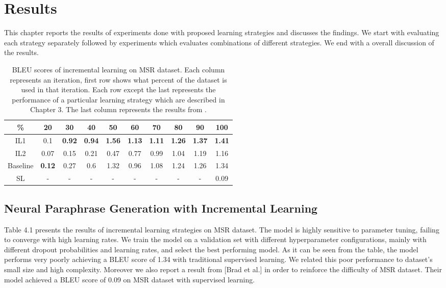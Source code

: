 \chapter{Results}\label{results}

This chapter reports the results of experiments done with proposed learning strategies and discusses the findings. We start with evaluating each strategy separately followed by experiments which evaluates combinations of different strategies. We end with a overall discussion of the results.

\begin{table}[t]
\centering
\large
 \begin{tabular}{|c | c | c | c | c | c | c | c | c | c |} 
 \hline
 \% & 20 & 30 & 40 & 50 & 60 & 70 & 80 & 90 & 100 \\ [0.5ex] 
 \hline
  IL1 & 0.1 &  \textbf{0.92} &  \textbf{0.94} &  \textbf{1.56} &  \textbf{1.13} &  \textbf{1.11} &  \textbf{1.26} &  \textbf{1.37} &  \textbf{1.41}  \\ 
 \hline
  IL2 & 0.07 & 0.15 & 0.21 & 0.47 & 0.77 & 0.99 & 1.04 & 1.19 & 1.16 \\ 
 \hline
 Baseline & \textbf{0.12} & 0.27 & 0.6 & 1.32 & 0.96 & 1.08 & 1.24 & 1.26 & 1.34 \\ 
 \hline
 SL & - & - & - & - & - & - & - & - & 0.09  \\ 
 \hline
\end{tabular}
\caption{BLEU scores of incremental learning on MSR dataset. Each column represents an iteration, first row shows what percent of the dataset is used in that iteration. Each row except the last represents the performance of a particular learning strategy which are described in Chapter 3. The last column represents the results from \cite{brad}.}
\label{table:4.1}
\end{table}

\section{Neural Paraphrase Generation with Incremental Learning}

Table 4.1 presents the results of incremental learning strategies on MSR dataset. The model is highly sensitive to parameter tuning, failing to converge with high learning rates. We train the model on a validation set with different hyperparameter configurations, mainly with different dropout probabilities and learning rates, and select the best performing model. As it can be seen from the table, the model performs very poorly achieving a BLEU score of 1.34 with traditional supervised learning. We related this poor performance to dataset's small size and high complexity. Moreover we also report a result from [Brad et al.] in order to reinforce the difficulty of MSR dataset. Their model achieved a BLEU score of 0.09 on MSR dataset with supervised learning. 

